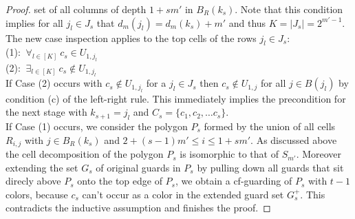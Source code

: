 \documentclass[a4paper,USenglish,numberwithinsect]{lipics}
\theoremstyle{plain}
\begin{document}
\begin{proof}
set of all columns of depth $1+sm'$ in  $B_R(k_s)$. Note that this condition implies
for all $j_l \in J_s$ that $d_m(j_l)=d_m(k_s)+m'$ and thus $K=|J_s|=2^{m'-1}$.
The new case inspection applies to the top cells of the rows $j_l \in J_s$: 
\\
  (1): $\ \forall_{l \in  [K]}\ c_s \in U_{1,j_l}$\\
  (2): $\ \exists_{l \in  [K]} \ c_s \not \in U_{1,j_l}$\\
If Case (2) occurs with $c_s \not \in U_{1,j_l}$ for a $j_l \in J_s$ then $c_s \not \in U_{1,j}$ for all $j \in B(j_l)$
by condition (c) of the left-right rule. This immediately implies the precondition for the next
stage with $k_{s+1}=j_l$ and $C_{s}=  \{c_1,c_2, \ldots c_{s}\}$. \\
If Case (1) occurs, we consider the polygon $P_s$ formed by the union of all cells
$R_{i,j}$ with $j \in  B_R(k_s)$ and $2+(s-1)m' \leq i \leq 1+sm'$. 
As discussed above the cell decomposition of the polygon $P_s$ is isomorphic to that
of $S_{m'}$. Moreover extending the set $G_s$ of original guards in $P_s$
by pulling down all guards that sit direcly above $P_s$  onto the top edge of 
$P_s$, we obtain a cf-guarding of $P_s$ with  $t-1$ colors, because 
 $c_s$ can't occur as a color in the extended guard set $G_s^+$.
This contradicts the inductive assumption and finishes the proof.   
\end{proof}
\end{document}
